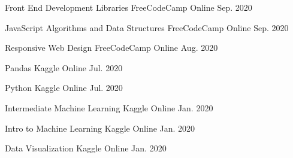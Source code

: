 

\begin{cvhonors}

  \cvhonor
    {Front End Development Libraries} %
    {FreeCodeCamp} %
    {Online} %
    {Sep. 2020} %

  \cvhonor
    {JavaScript Algorithms and Data Structures} %
    {FreeCodeCamp} %
    {Online} %
    {Sep. 2020} %

  \cvhonor
    {Responsive Web Design} %
    {FreeCodeCamp} %
    {Online} %
    {Aug. 2020} %

  \cvhonor
    {Pandas} %
    {Kaggle} %
    {Online} %
    {Jul. 2020} %

  \cvhonor
    {Python} %
    {Kaggle} %
    {Online} %
    {Jul. 2020} %

  \cvhonor
    {Intermediate Machine Learning} %
    {Kaggle} %
    {Online} %
    {Jan. 2020} %

  \cvhonor
    {Intro to Machine Learning} %
    {Kaggle} %
    {Online} %
    {Jan. 2020} %

  \cvhonor
    {Data Visualization} %
    {Kaggle} %
    {Online} %
    {Jan. 2020} %

\end{cvhonors}
